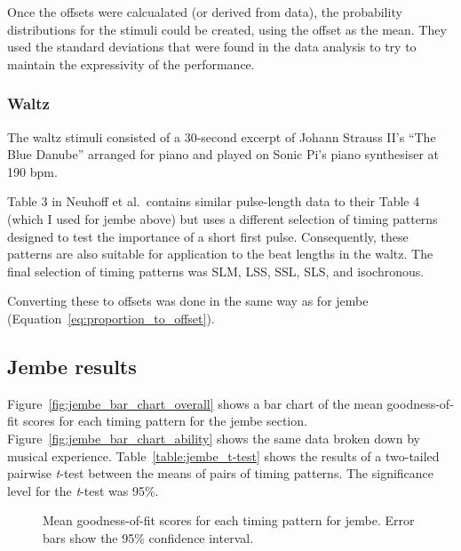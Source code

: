 \documentclass[12pt,twoside,openright]{report}
\begin{document}
Once the offsets were calcualated (or derived from data), the probability distributions for the stimuli could be created, using the offset as the mean. They used the standard deviations that were found in the data analysis to try to maintain the expressivity of the performance.

\subsubsection{Waltz} \label{waltz_stimuli}

The waltz stimuli consisted of a 30-second excerpt of Johann Strauss II's ``The
Blue Danube'' arranged for piano and played on Sonic Pi's piano synthesiser at
190 bpm.

Table 3 in Neuhoff et al.\ contains similar
pulse-length data to their Table 4 (which I used for jembe above) but uses a different
selection of timing patterns designed to test the importance of a short first
pulse. Consequently, these patterns are also suitable for application to the
beat lengths in the waltz. The final selection of timing patterns was SLM, LSS,
SSL, SLS, and isochronous.

Converting these to offsets was done in the same way as for jembe (Equation~\ref{eq:proportion_to_offset}).


\subsection{Jembe results} \label{user_study_jembe_results}

Figure~\ref{fig:jembe_bar_chart_overall} shows a bar chart of the mean goodness-of-fit scores for each timing
pattern for the jembe section. Figure~\ref{fig:jembe_bar_chart_ability} shows the same data broken down by
musical experience. Table~\ref{table:jembe_t-test} shows the results of a two-tailed pairwise \textit{t}-test between the means of pairs of timing patterns. The significance level for the \textit{t}-test was 95\%.

\begin{figure}[ht]
    \centering
    \caption{Mean goodness-of-fit scores for each timing pattern for jembe. Error bars show the 95\% confidence interval.}
    \label{fig:jembe_bar_charts}
\end{figure}
\end{document}

